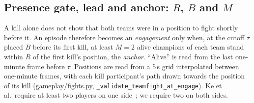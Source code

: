 \subsection{Presence gate, lead and anchor: \texorpdfstring{$R$, $B$ and $M$}{R, B and M}}

A kill alone does not show that both teams were in a position to fight shortly before it. An episode
therefore becomes an \emph{engagement} only when, at the cutoff
$\tau$ placed $B$ before its first kill, at least $M = 2$ alive champions of each team stand within $R$
of the first kill's position, the \emph{anchor}. ``Alive'' is read from the last one-minute frame before
$\tau$. Positions are read from a 5\,s grid interpolated between one-minute frames, with each kill
participant's path drawn towards the position of its kill (gameplay/fights.py,
\texttt{\_validate\_teamfight\_at\_engage}). Ke et al.\ require at least two players on one
side~\cite{ke2022}; we require two on both sides.

